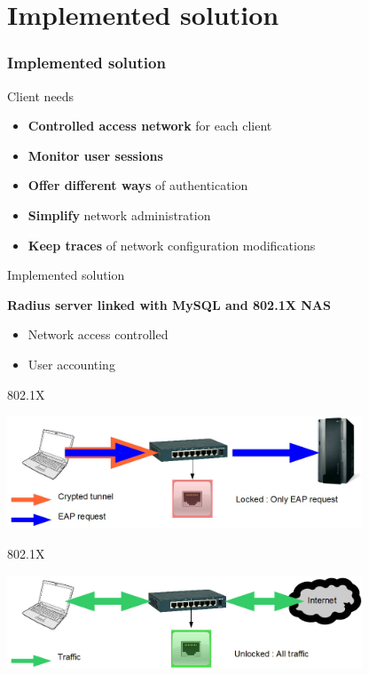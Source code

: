 \documentclass[12pt]{beamer}
\begin{document}
\part{Implemented solution}
\frame{\partpage}
\section{Implemented solution}

\begin{frame}{Client needs}
    \begin{itemize}[<+->]
	\item \textbf{Controlled access network} for each client
	\vfill
	\item \textbf{Monitor user sessions}
	\vfill 
	\item \textbf{Offer different ways} of authentication
	\vfill
	\item \textbf{Simplify} network administration
	\vfill
	\item \textbf{Keep traces} of network configuration modifications
    \end{itemize}
\end{frame}

\begin{frame}{Implemented solution}
    \begin{center}
    \textbf{Radius server linked with MySQL and 802.1X NAS}
    \end{center}

    \pause
    \begin{itemize}[<+->]\vfill
	\item Network access controlled\vfill
	\item User accounting\vfill
    \end{itemize}
\end{frame}

\begin{frame}{802.1X}
\vfill
\begin{center}
    \includegraphics[width=300pt]{img/dot1x_1.png}
\end{center}
\vfill
\end{frame}

\begin{frame}{802.1X}
\vfill
\begin{center}
    \includegraphics[width=300pt]{img/dot1x_2.png}
\end{center}
\vfill
\end{frame}
\end{document}
